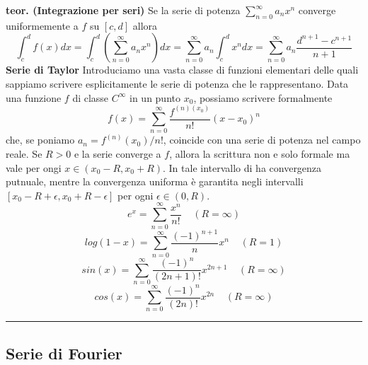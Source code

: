 \newline
\textbf{teor. (Integrazione per seri)}\newline
Se la serie di potenza $\sum_{n=0}^{\infty} a_n x^n$ converge uniformemente a $f$ su $[c,d]$ allora
\[
    \int_{c}^{d}f(x) dx = \int_{c}^{d}\left(\sum_{n=0}^{\infty}a_n x^n\right)dx = \sum_{n=0}^{\infty}a_n \int_{c}^{d}x^n dx = \sum_{n=0}^{\infty} a_n \frac{d^{n+1}- c^{n+1}}{n+1}
\]
\newline
\textbf{Serie di Taylor}\newline
Introduciamo una vasta classe di funzioni elementari delle quali sappiamo scrivere esplicitamente le serie di potenza che le rappresentano.\newline
Data una funzione $f$ di classe $C^\infty$ in un punto $x_0$, possiamo scrivere formalmente
\[
    f(x) = \sum_{n=0}^{\infty} \frac{f^{(n)(x_0)}}{n!}(x-x_0)^n
\]
che, se poniamo $a_n = f^{(n)}(x_0)/n!$, coincide con una serie di potenza nel campo reale. Se $R > 0$ e la serie converge a $f$, allora la scrittura non e solo formale ma vale per ongi $x \in (x_0 - R, x_0 + R)$. In tale intervallo di ha convergenza putnuale, mentre la convergenza uniforma è garantita negli intervalli $[x_0 - R + \epsilon, x_0 + R -\epsilon]$ per ogni $\epsilon \in (0,R)$.
\[
    e^x = \sum_{n=0}^{\infty} \frac{x^n}{n!} \;\;\;\; (R= \infty)
\]
\[
    log(1-x) = \sum_{n=0}^{\infty} \frac{(-1)^{n+1}}{n} x^n\;\;\;\; (R=1)
\]
\[
    sin(x) = \sum_{n=0}^{\infty} \frac{(-1)^n}{(2n+1)!} x^{2n+1}\;\;\;\; (R= \infty)
\]
\[
    cos(x) = \sum_{n=0}^{\infty} \frac{(-1)^n}{(2n)!}x^{2n}\;\;\;\; (R= \infty)
\]
\rule{\textwidth}{2pt}
\subsection*{Serie di Fourier}
